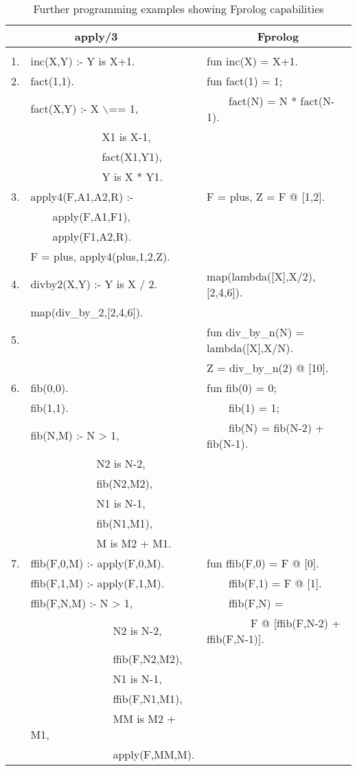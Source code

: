 \documentclass[a4paper,11pt,twoside]{article}
\begin{document}
\begin{table}[htb]
{\footnotesize
\tt
\begin{tabular}{| l | l | l |}
\hline
   &~~~~~~~apply/3                &~~~~~~~~Fprolog \\
\hline
& & \\
1. &inc(X,Y) :- Y is X+1.            &fun inc(X) = X+1.\\
2. &fact(1,1).                       &fun fact(1) = 1;\\
   &fact(X,Y) :- X $\backslash$== 1, &~~~~fact(N) = N * fact(N-1).\\
   &~~~~~~~~~~~~~X1 is X-1,       &\\
   &~~~~~~~~~~~~~fact(X1,Y1),     &\\
   &~~~~~~~~~~~~~Y is X * Y1.     &\\
3. &apply4(F,A1,A2,R) :-          &F = plus, Z = F @ [1,2].\\
   &~~~~apply(F,A1,F1),           &\\
   &~~~~apply(F1,A2,R).           &\\
   &F = plus, apply4(plus,1,2,Z). &\\
4. &divby2(X,Y) :- Y is X / 2.    &map(lambda([X],X/2),[2,4,6]).\\
   &map(div\_{}by\_{}2,[2,4,6]).  &\\
5. &                              &fun div\_{}by\_{}n(N) = lambda([X],X/N).\\
   &                              &Z = div\_{}by\_{}n(2) @ [10].\\
6. &fib(0,0).                     &fun fib(0) = 0;\\
   &fib(1,1).                     &~~~~fib(1) = 1;\\
   &fib(N,M) :- N > 1,            &~~~~fib(N) = fib(N-2) + fib(N-1).\\
   &~~~~~~~~~~~~N2 is N-2,        &\\
   &~~~~~~~~~~~~fib(N2,M2),       &\\
   &~~~~~~~~~~~~N1 is N-1,        &\\
   &~~~~~~~~~~~~fib(N1,M1),       &\\
   &~~~~~~~~~~~~M is M2 + M1.     &\\
7. &ffib(F,0,M) :- apply(F,0,M).  &fun ffib(F,0) = F @ [0].\\
   &ffib(F,1,M) :- apply(F,1,M).  &~~~~ffib(F,1) = F @ [1].\\
   &ffib(F,N,M) :- N > 1,         &~~~~ffib(F,N) =\\
   &~~~~~~~~~~~~~~~N2 is N-2,     &~~~~~~~~F @ [ffib(F,N-2) + ffib(F,N-1)].\\
   &~~~~~~~~~~~~~~~ffib(F,N2,M2), &\\
   &~~~~~~~~~~~~~~~N1 is N-1,     &\\
   &~~~~~~~~~~~~~~~ffib(F,N1,M1), &\\
   &~~~~~~~~~~~~~~~MM is M2 + M1, &\\
   &~~~~~~~~~~~~~~~apply(F,MM,M). &\\
\hline
\end{tabular}
}
\label{prologpf_syntax_advantages}
\caption{Further programming examples showing Fprolog capabilities}
\end{table}
\end{document}
